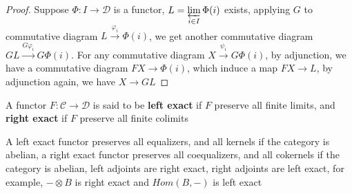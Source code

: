 \documentclass[../main.tex]{subfiles}
\begin{document}
\begin{proof}
Suppose $\Phi:I\to\mathscr D$ is a functor, $\displaystyle L=\varprojlim_{i\in I}\Phi(i)$ exists, applying $G$ to commutative diagram $L\xrightarrow{\varphi_i}\Phi(i)$, we get another commutative diagram $GL\xrightarrow{G\varphi_i}G\Phi(i)$. For any commutative diagram $X\xrightarrow{\psi_i}G\Phi(i)$, by adjunction, we have a commutative diagram $FX\to\Phi(i)$, which induce a map $FX\to L$, by adjunction again, we have $X\to GL$
\end{proof}

\begin{definition}
A functor $F:\mathscr C\to\mathscr D$ is said to be \textbf{left exact} if $F$ preserve all finite limits, and \textbf{right exact} if $F$ preserve all finite colimits
\end{definition}

\begin{example}
A left exact functor preserves all equalizers, and all kernels if the category is abelian, a right exact functor preserves all coequalizers, and all cokernels if the category is abelian, left adjoints are right exact, right adjoints are left exact, for example, $-\otimes B$ is right exact and $Hom(B,-)$ is left exact
\end{example}
\end{document}
